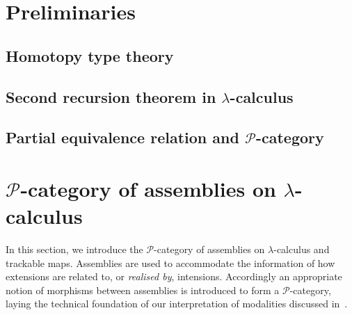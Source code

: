 \documentclass[a4paper,UKenglish,numberwithinsect,cleveref,thm-restate]{lipics-v2021}
\newcommand{\PP}{\mathscr{P}}
\theoremstyle{plain}
\begin{document}
\section{Preliminaries}\label{sec:preliminaries}

\subsection{Homotopy type theory}
\cite{hottbook}

\subsection{Second recursion theorem in \texorpdfstring{$\lambda$}{λ}-calculus}
\begin{theorem}
  
\end{theorem}
\begin{corollary}\label{coro:variant-of-SRT}
  
\end{corollary}

\subsection{Partial equivalence relation and \texorpdfstring{$\PP$}{P}-category}
\cite{Cubric1998a,Kavvos2017b}

\section{\texorpdfstring{$\PP$}{P}-category of assemblies on \texorpdfstring{$\lambda$}{λ}-calculus}\label{sec:assemblies}
In this section, we introduce the $\PP$-category of assemblies on $\lambda$-calculus and trackable maps.
Assemblies are used to accommodate the information of how extensions are related to, or \emph{realised by}, intensions. Accordingly an appropriate notion of morphisms between assemblies is introduced to form a $\PP$-category, laying
the technical foundation of our interpretation of modalities discussed in~.
\end{document}
